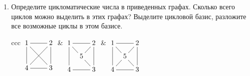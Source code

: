 \begin{enumerate}
    \item Определите цикломатические числа в приведенных графах. Сколько всего циклов можно выделить в этих графах? Выделите цикловой базис, разложите все возможные циклы в этом базисе.
    
    \begin{tabular}{ccc}
        \(    
            {\xymatrix{
                1 \ar@{-}[d] \ar@{-}[dr] \ar@{-}[r]
                    &2 \ar@{-}[dl] \ar@{-}[d]
                        \\
                4 \ar@{-}[r]
                    &3 
            }}
        \)   
        &        
        \(    
            {\xymatrix@=7pt{
                1 \ar@{-}[dd] \ar@{-}[dr] \ar@{-}[rr]
                    &*{}
                        &2 \ar@{-}[dl] \ar@{-}[dd]
                            \\
                *{}
                    &5 \ar@{-}[dr]
                        &*{}
                            \\
                4 \ar@{-}[rr]
                    &*{}
                        &3 
            }}
        \)
        &
        \(    
            {\xymatrix@=7pt{
                1 \ar@{-}[dd] \ar@{-}[dr] \ar@{-}[rr]
                    &*{}
                        &2 \ar@{-}[dl] \ar@{-}[dd]
                            \\
                *{}
                    &5 \ar@{-}[dr] \ar@{-}[dl]
                        &*{}
                            \\
                4 \ar@{-}[rr]
                    &*{}
                        &3 
            }}
        \)
    \end{tabular}
    
\end{enumerate}
